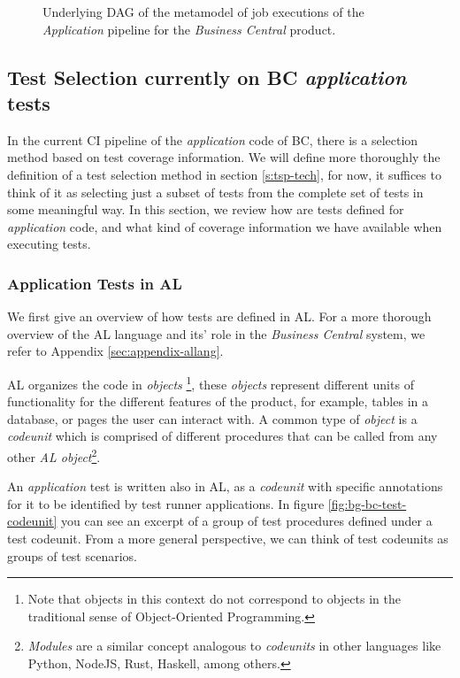 \begin{figure}
    \centering
    \def\svgscale{0.1}
    
    \caption{Underlying DAG of the metamodel of job executions of the \emph{Application} pipeline for the \emph{Business Central} product.}
    \label{fig:full-job-metamodel-dag}
\end{figure}

\subsection{Test Selection currently on BC \emph{application} tests}
\label{sec:bg-bc-test-selection-currently}

In the current CI pipeline of the \emph{application} code of BC, there is 
a selection method based on test coverage information. We will
define more thoroughly the definition of a test selection method in section \ref{s:tsp-tech},
for now, it suffices to think of it as selecting just a subset of tests from the complete
set of tests in some meaningful way. In this section, we review how are tests defined for \emph{application} code, and what kind
of coverage information we have available when executing tests.

\subsubsection{Application Tests in AL}\label{sec:app-tests-al}
We first give an overview of how tests are defined in AL.  For a more thorough overview of the AL
language and its' role in the \emph{Business Central} system, we refer to Appendix \ref{sec:appendix-allang}.

AL organizes the code in \emph{objects} \footnote{Note that objects in this context do not 
correspond to objects in the traditional sense of Object-Oriented Programming.}, these
\emph{objects} represent different units of functionality for the different features of the
product, for example, tables in a database, or pages the user can interact with. A common 
type of \emph{object} is a \emph{codeunit} which is comprised of different procedures that
can be called from any other \emph{AL object}\footnote{\emph{Modules} are a similar concept analogous
to \emph{codeunits} in other languages like Python, NodeJS, Rust, Haskell, among others.}.

An \emph{application} test is written also in AL, as a \emph{codeunit} with specific annotations for it to 
be identified by test runner applications. In figure \ref{fig:bg-bc-test-codeunit} you can see
an excerpt of a group of test procedures defined under a test codeunit. From a more general perspective, 
we can think of test codeunits as groups of test scenarios.

